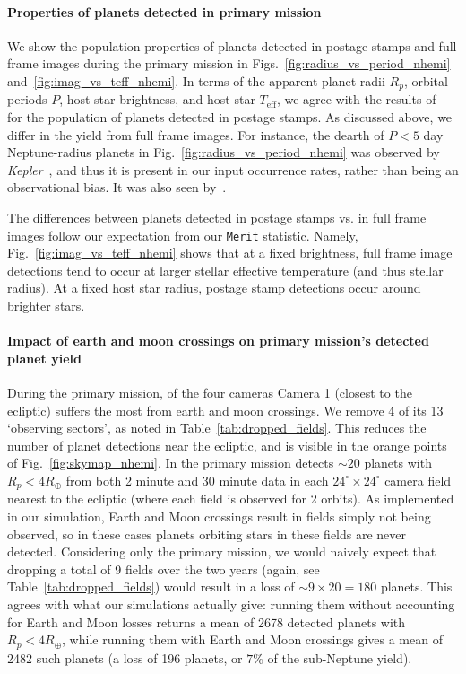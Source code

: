 \paragraph{Properties of planets detected in primary mission} 
We show the population properties of planets detected in postage stamps and full frame images during the primary mission in Figs.~\ref{fig:radius_vs_period_nhemi} and~\ref{fig:imag_vs_teff_nhemi}.
In terms of the apparent planet radii $R_p$, orbital periods $P$, host star brightness, and host star $T_\mathrm{eff}$, we agree with the results of~ for the population of planets detected in postage stamps.
As discussed above, we differ in the yield from full frame images.
For instance, the dearth of $P<5$ day Neptune-radius planets in Fig.~\ref{fig:radius_vs_period_nhemi} was observed by \textit{Kepler}~\citep{mazeh_dearth_2016}, and thus it is present in our input occurrence rates, rather than being an observational bias. 
It was also seen by~.

The differences between planets detected in postage stamps vs. in full frame images follow our expectation from our \texttt{Merit} statistic. 
Namely, Fig.~\ref{fig:imag_vs_teff_nhemi} shows that at a fixed brightness, full frame image detections tend to occur at larger stellar effective temperature (and thus stellar radius).
At a fixed host star radius, postage stamp detections occur around brighter stars.

\paragraph{Impact of earth and moon crossings on primary mission's detected planet yield}
During the primary mission, of the four cameras Camera 1 (closest to the ecliptic) suffers the most from earth and moon crossings.
We remove 4 of its 13 `observing sectors', as noted in Table~\ref{tab:dropped_fields}.
This reduces the number of planet detections near the ecliptic, and is visible in the orange points of Fig.~\ref{fig:skymap_nhemi}.
In the primary mission \tess detects $\sim20$ planets with $R_p<4R_\oplus$ from both 2 minute and 30 minute data in each $24^\circ\times24^\circ$ camera field nearest to the ecliptic (where each field is observed for 2 \tess orbits).
As implemented in our simulation, Earth and Moon crossings result in fields simply not being observed, so in these cases planets orbiting stars in these fields are never detected.
Considering only the primary mission, we would naively expect that dropping a total of 9 fields over the two years (again, see Table~\ref{tab:dropped_fields}) would result in a loss of $\sim9\times20=180$ planets.
This agrees with what our simulations actually give: running them without accounting for Earth and Moon losses returns a mean of 2678 detected planets with $R_p<4R_\oplus$, while running them with Earth and Moon crossings gives a mean of 2482 such planets (a loss of 196 planets, or $7\%$ of the sub-Neptune yield).
